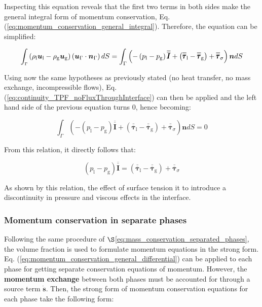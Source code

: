 Inspecting this equation reveals that the first two terms in both sides make the general integral form of momentum conservation, Eq. (\ref{eq:momentum_conservation_general_integral}). Therefore, the equation can be simplified:

\begin{equation}
\int_\mathsmaller{\Gamma} \left( \rho_\mathrm{l} \boldsymbol{u}_\mathrm{l} - \rho_\mathrm{g} \boldsymbol{u}_\mathrm{g} \right) \left( \boldsymbol{u}_{\scriptsize{\Gamma}} \cdot \boldsymbol{n}_{\scriptsize{\Gamma}} \right) dS =  \int_{\Gamma} \left( - \left( p_\mathrm{l} - p_\mathrm{g} \right) \overline{\overline{\pmb{I}}} + \left( \overline{\overline{\pmb{\tau}}}_\mathrm{l} - \overline{\overline{\pmb{\tau}}}_\mathrm{g}  \right) + \overline{\overline{\pmb{\tau}}}_\sigma  \right) \boldsymbol{n} dS
\end{equation}

Using now the same hypotheses as previously stated (no heat transfer, no mass exchange, incompressible flows), Eq.  (\ref{eq:continuity_TPF_noFluxThroughInterface}) can then be applied and the left hand side of the previous equation turns 0, hence becoming:

\begin{equation}
\int_{\Gamma} \left( - \left( p_\mathrm{l} - p_\mathrm{g} \right) \overline{\overline{\pmb{I}}} + \left( \overline{\overline{\pmb{\tau}}}_\mathrm{l} - \overline{\overline{\pmb{\tau}}}_\mathrm{g}  \right) + \overline{\overline{\pmb{\tau}}}_\sigma  \right) \boldsymbol{n} dS = 0
\end{equation}

From this relation, it directly follows that:

\begin{equation}
\boxed{
\left( p_\mathrm{l} - p_\mathrm{g} \right) \overline{\overline{\pmb{I}}} = \left( \overline{\overline{\pmb{\tau}}}_\mathrm{l} - \overline{\overline{\pmb{\tau}}}_\mathrm{g}  \right) + \overline{\overline{\pmb{\tau}}}_\sigma  
}
\end{equation}

As shown by this relation, the effect of surface tension it to introduce a discontinuity in pressure and viscous effects in the interface. 

\subsubsection*{Momentum conservation in separate phases}

Following the same procedure of $\S$\ref{eq:mass_conservation_separated_phases}, the volume fraction is used to formulate momentum equations in the strong form. Eq. (\ref{eq:momentum_conservation_general_differential}) can be applied to each phase for getting separate conservation equations of momentum. However, the \textbf{momentum exchange} between both phases must be accounted for through a source term $\dot{\boldsymbol{s}}$. Then, the strong form of momentum conservation equations for each phase take the following form:


